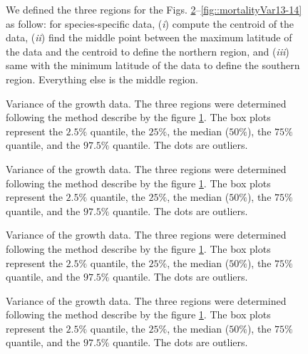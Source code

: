 \documentclass[letterpaper, 12pt]{article}
\theoremstyle{theo}
\begin{document}
\begin{refsection}
\begin{onehalfspace}
\begin{figure}
	\centering
	
	\caption[Definition 3 regions]{We defined the three regions for the Figs. \ref{fig::growthVar1-3}--\ref{fig::mortalityVar13-14} as follow: for species-specific data, (\textit{i}) compute the centroid of the data, (\textit{ii}) find the middle point between the maximum latitude of the data and the centroid to define the northern region, and (\textit{iii}) same with the minimum latitude of the data to define the southern region. Everything else is the middle region. \label{fig::defineRegion}}
\end{figure}

\begin{figure}
	\centering
	
	\caption[Growth variation, species 1--3]{Variance of the growth data. The three regions were determined following the method describe by the figure \ref{fig::defineRegion}. The box plots represent the $ 2.5 \%$ quantile, the $ 25 \% $, the median ($ 50 \% $), the $ 75 \% $ quantile, and the $ 97.5 \% $ quantile. The dots are outliers. \label{fig::growthVar1-3}}
\end{figure}

\begin{figure}
	\centering
	
	\caption[Growth variation, species 4--6]{Variance of the growth data. The three regions were determined following the method describe by the figure \ref{fig::defineRegion}. The box plots represent the $ 2.5 \%$ quantile, the $ 25 \% $, the median ($ 50 \% $), the $ 75 \% $ quantile, and the $ 97.5 \% $ quantile. The dots are outliers. \label{fig::growthVar4-6}}
\end{figure}

\begin{figure}
	\centering
	
	\caption[Growth variation, species 7--9]{Variance of the growth data. The three regions were determined following the method describe by the figure \ref{fig::defineRegion}. The box plots represent the $ 2.5 \%$ quantile, the $ 25 \% $, the median ($ 50 \% $), the $ 75 \% $ quantile, and the $ 97.5 \% $ quantile. The dots are outliers. \label{fig::growthVar7-9}}
\end{figure}

\begin{figure}
	\centering
	
	\caption[Growth variation, species 10--12]{Variance of the growth data. The three regions were determined following the method describe by the figure \ref{fig::defineRegion}. The box plots represent the $ 2.5 \%$ quantile, the $ 25 \% $, the median ($ 50 \% $), the $ 75 \% $ quantile, and the $ 97.5 \% $ quantile. The dots are outliers. \label{fig::growthVar10-12}}
\end{figure}


\end{onehalfspace}
\end{refsection}
\end{document}
